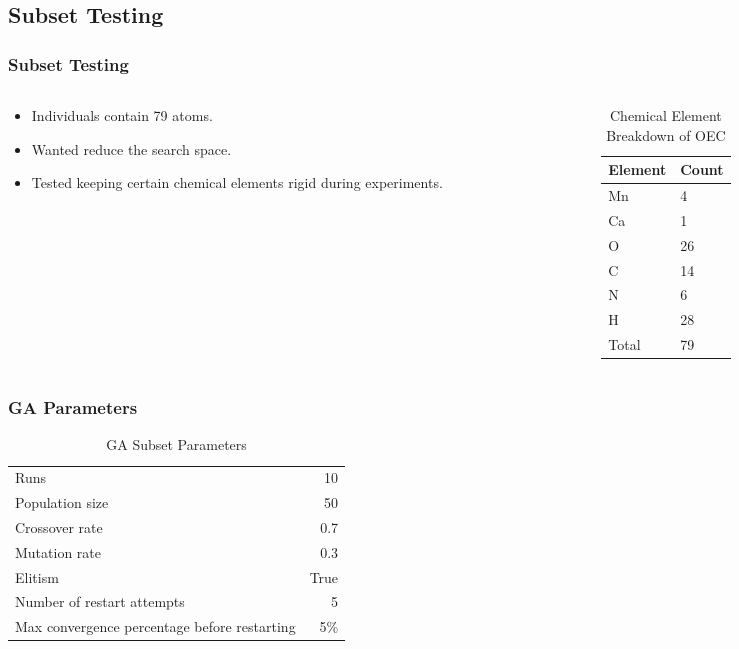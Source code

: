 \documentclass[10pt]{beamer}
\begin{document}
\subsection{Subset Testing}

\begin{frame}
	\frametitle{Subset Testing}

	\begin{columns}[T]
		\begin{column}{.5\textwidth}
			\begin{itemize}
				\item Individuals contain 79 atoms.
				\item Wanted reduce the search space.
				\item Tested keeping certain chemical elements rigid during experiments.
			\end{itemize}
		\end{column}
		\begin{column}{.5\textwidth}
			\begin{table}
				\caption{Chemical Element Breakdown of OEC}
				\begin{tabular}{ | l | l | }
				  \hline
				    Element & Count \\ \hline
				    Mn & 4 \\ \hline
				    Ca & 1 \\ \hline
				    O & 26 \\ \hline
				    C & 14 \\ \hline
				    N & 6 \\ \hline
				    H & 28 \\ \hline
				    Total & 79 \\ \hline
				\end{tabular}
			\end{table}
		\end{column}
	\end{columns}

\end{frame}

\begin{frame}
	\frametitle{GA Parameters}

	\begin{table}
		\caption{GA Subset Parameters}
		\begin{tabular}{ l r }
		  \hline
		    Runs & 10 \\
		    Population size & 50 \\
		    Crossover rate & 0.7 \\
		    Mutation rate & 0.3 \\
		    Elitism & True \\
		    Number of restart attempts & 5 \\
		    Max convergence percentage before restarting & 5\% \\
		  \hline
		\end{tabular}
	\end{table}

\end{frame}
\end{document}
